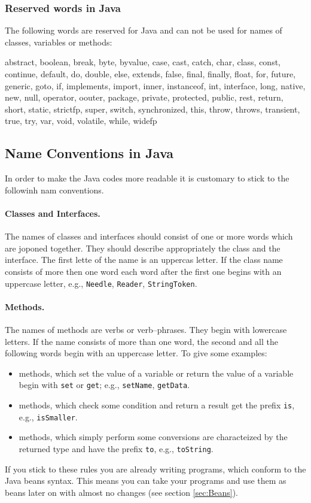 \subsubsection{Reserved words in Java}
The following words are reserved for Java and can not be used for names
of classes, variables or methods:
\begin{sverbatim}
abstract, boolean, break, byte, byvalue, case, cast, catch, char,
class, const, continue, default, do, double, else, extends,
false, final, finally, float, for, future, generic, goto, if,
implements, import, inner, instanceof, int, interface, long,
native, new, null, operator, oouter, package, private, protected, 
public, rest, return, short, static, strictfp, super, switch, 
synchronized, this, throw, throws, transient, true, try, var,
void, volatile, while, widefp
\end{sverbatim}


\subsection{Name Conventions in Java}
In order to make the Java codes more readable it is customary to stick
to the followinh nam conventions.

\paragraph{Classes and Interfaces.} The names of classes and interfaces
  should consist of one or more words which are joponed together. They
  should describe appropriately the class and the interface. 
The first lette of the name is an uppercas letter. If the
  class name consists of more then one word each word after the first
  one begins with an uppercase letter, e.g., \verb|Needle|,
  \verb|Reader|, \verb|StringToken|.

\paragraph{Methods.} The names of methods are verbs or verb--phrases. 
  They begin with lowercase letters. If the name consists of
  more than one word, the second and all the following words begin
  with an uppercase letter. To give some examples:
\begin{itemize}
\item methods, which set the value of a variable or return the value of
  a variable begin with \verb|set| or \verb|get|; e.g.,
  \verb|setName|, \verb|getData|.
\item methods, which check some condition and return a result  get the
  prefix \verb|is|, e.g., \verb|isSmaller|.
\item methods, which simply perform some conversions are characteized
  by the returned type and have the prefix \verb|to|, e.g.,
  \verb|toString|.
\end{itemize}
If you stick to these rules you are already writing programs, which
conform to the Java beans syntax. This means you can take your
programs and use them as beans later on with almost no changes
(see section \ref{sec:Beans}).


